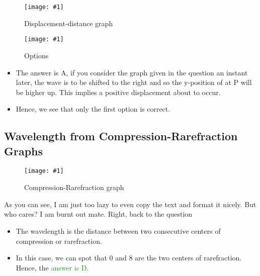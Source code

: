 \documentclass[a4paper,12pt]{article}
\newcommand{\img}[4]{\begin{center}
  \begin{figure}[H]
    \centering
    \texttt{[image: \#1]}
    \caption{#3}
    \label{fig:#4}
  \end{figure}
\end{center}}
\begin{document}
\img{ex/1.png}{0.7}{Displacement-distance graph}{ex1}

\img{ex/2.png}{0.7}{Options}{ex2}

\begin{itemize}
  \item The answer is A, if you consider the graph given in the question an instant later, the wave is to be shifted to the right and so the y-position of at P will be higher up. This implies a positive displacement about to occur.
  \item Hence, we see that only the first option is correct.
\end{itemize}

\pagebreak

\subsection{Wavelength from Compression-Rarefraction Graphs}

\img{ex/3.png}{0.7}{Compression-Rarefraction graph}{ex3}

As you can see, I am just too lazy to even copy the text and format it nicely. But who cares? I am burnt out mate. Right, back to the question
\begin{itemize}
  \item The wavelength is the distance between two consecutive centers of compression or rarefraction.
  \item In this case, we can spot that 0 and 8 are the two centers of rarefraction. Hence, the \textcolor{ForestGreen}{answer is D}.
\end{itemize}
\end{document}
